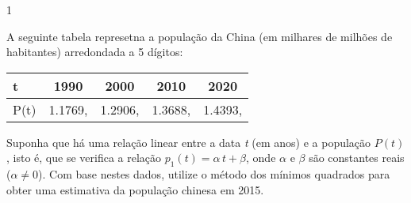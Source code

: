 \documentclass["CN_A-Exercises_Resolutions.tex"]{subfiles}
\begin{document}
\setcounter{question}{17}
\begin{questionBox}1{} %

  A seguinte tabela represetna a população da China (em milhares de milhões de habitantes) arredondada a 5 dígitos:
  \begin{center}
    \vspace{1ex}
    \begin{tabular}{L || *{4}{C}}

      t & 1990 & 2000 & 2010 & 2020

      \\\hline

      P(t) 
      & 1.1769,
      & 1.2906,
      & 1.3688,
      & 1.4393,

    \end{tabular}
    \vspace{2ex}
  \end{center}
  Suponha que há uma relação linear entre a data \textit{t} (em anos) e a população \(P(t)\), isto é, que se verifica a relação \(p_1(t) = \alpha\,t + \beta\), onde \(\alpha\) e \(\beta\) são constantes reais (\(\alpha\neq0\)). Com base nestes dados, utilize o método dos mínimos quadrados para obter uma estimativa da população chinesa em 2015.

  \answer{}


\end{questionBox}
\end{document}
